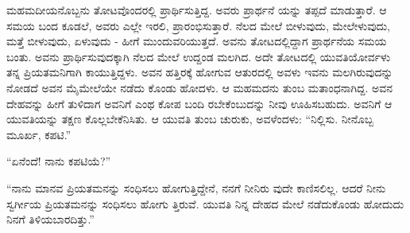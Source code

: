 ಮಹಮದೀಯನೊಬ್ಬನು ತೋಟವೊಂದರಲ್ಲಿ ಪ್ರಾರ್ಥಿಸುತ್ತಿದ್ದ. ಅವರು ಪ್ರಾರ್ಥನೆ ಯನ್ನು ತಪ್ಪದೆ ಮಾಡುತ್ತಾರೆ. ಆ ಸಮಯ ಬಂದ ಕೂಡಲೆ, ಅವರು ಎಲ್ಲೇ ಇರಲಿ, ಪ್ರಾರಂಭಿಸುತ್ತಾರೆ. ನೆಲದ ಮೇಲೆ ಬೀಳುವುದು, ಮೇಲೇಳುವುದು, ಮತ್ತೆ ಬೀಳುವುದು, ಏಳುವುದು - ಹೀಗೆ ಮುಂದುವರಿಯುತ್ತದೆ. ಅವನು ತೋಟದಲ್ಲಿದ್ದಾಗ ಪ್ರಾರ್ಥನೆಯ ಸಮಯ ಬಂತು. ಅವನು ಪ್ರಾರ್ಥಿಸುವುದಕ್ಕಾಗಿ ನೆಲದ ಮೇಲೆ ಉದ್ದಂಡ ಮಲಗಿದ. ಅದೇ ತೋಟದಲ್ಲಿ ಯುವತಿಯೋರ್ವಳು ತನ್ನ ಪ್ರಿಯತಮನಿಗಾಗಿ ಕಾಯುತ್ತಿದ್ದಳು. ಅವನ ಹತ್ತಿರಕ್ಕೆ ಹೋಗುವ ಆತುರದಲ್ಲಿ ಅವಳು ಇವನು ಮಲಗಿರುವುದನ್ನು ನೋಡದೆ ಅವನ ಮೈಮೇಲೆಯೇ ನಡೆದು ಕೊಂಡು ಹೋದಳು. ಆ ಮಹಮದನು ತುಂಬ ಮತಾಂಧನಾಗಿದ್ದ. ಅವನ ದೇಹವನ್ನು ಹೀಗೆ ತುಳಿದಾಗ ಅವನಿಗೆ ಎಂಥ ಕೋಪ ಬಂದಿ ರಬೇಕೆಂಬುದನ್ನು ನೀವು ಊಹಿಸಬಹುದು. ಅವನಿಗೆ ಆ ಯುವತಿಯನ್ನು ತಕ್ಷಣ ಕೊಲ್ಲಬೇಕೆನಿಸಿತು. ಆ ಯುವತಿ ತುಂಬ ಚುರುಕು, ಅವಳೆಂದಳು: “ನಿಲ್ಲಿಸು. ನೀನೊಬ್ಬ ಮೂರ್ಖ, ಕಪಟಿ.”

“ಏನೆಂದೆ! ನಾನು ಕಪಟಿಯೆ?”

“ನಾನು ಮಾನವ ಪ್ರಿಯತಮನನ್ನು ಸಂಧಿಸಲು ಹೋಗುತ್ತಿದ್ದೇನೆ, ನನಗೆ ನೀನಿರು ವುದೇ ಕಾಣಿಸಲಿಲ್ಲ. ಆದರೆ ನೀನು ಸ್ವರ್ಗೀಯ ಪ್ರಿಯತಮನನ್ನು ಸಂಧಿಸಲು ಹೋಗು ತ್ತಿರುವೆ. ಯುವತಿ ನಿನ್ನ ದೇಹದ ಮೇಲೆ ನಡೆದುಕೊಂಡು ಹೋದುದು ನಿನಗೆ ತಿಳಿಯಬಾರದಿತ್ತು.”

